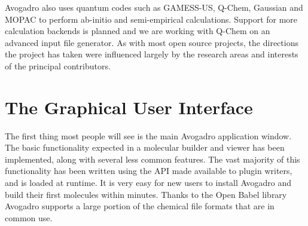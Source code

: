 \documentclass{article}
\begin{document}
Avogadro also uses quantum codes such as GAMESS-US, Q-Chem, Gaussian and MOPAC to perform ab-initio and semi-empirical calculations. Support for more calculation backends is planned and we are working with Q-Chem on an advanced input file generator. As with most open source projects, the directions the project has taken were influenced largely by the research areas and interests of the principal contributors.

\section{The Graphical User Interface}



The first thing most people will see is the main Avogadro application window.
The basic functionality expected in a molecular builder and viewer has been
implemented, along with several less common features. The vast majority of this
functionality has been written using the API made available to plugin writers,
and is loaded at runtime. It is very easy for new users to install Avogadro and
build their first molecules within minutes. Thanks to the Open Babel library
Avogadro supports a large portion of the chemical file formats that are in
common use.
\end{document}
